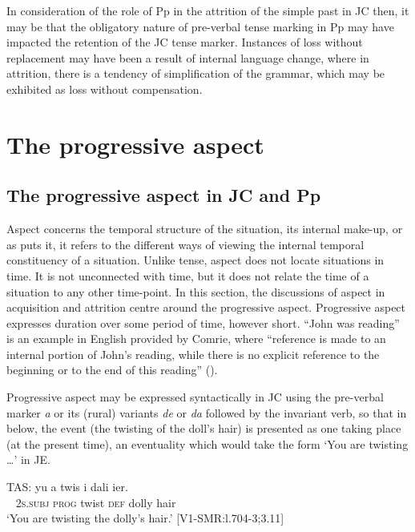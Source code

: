 \documentclass[output=paper,colorlinks,citecolor=brown]{langscibook}
\begin{document}
In consideration of the role of Pp in the attrition of the simple past in JC then, it may be that the obligatory nature of pre-verbal tense marking in Pp may have impacted the retention of the JC tense marker. Instances of loss without replacement may have been a result of internal language change, where in attrition, there is a tendency of simplification of the grammar, which may be exhibited as loss without compensation.

\section{The progressive aspect} \label{sec:messamk:5}
\subsection{The progressive aspect in JC and Pp } \label{sec:messamk:5.1}

 Aspect concerns the temporal structure of the situation, its internal make-up, or as \citet[3]{Comrie1976} puts it, it refers to the different ways of viewing the internal temporal constituency of a situation. Unlike tense, aspect does not locate situations in time. It is not unconnected with time, but it does not relate the time of a situation to any other time-point.  In this section, the discussions of aspect in acquisition and attrition centre around the progressive aspect. Progressive aspect expresses duration over some period of time, however short. “John was reading” is an example in English provided by Comrie, where “reference is made to an internal portion of John’s reading, while there is no explicit reference to the beginning or to the end of this reading” (\citeyear[4]{Comrie1976}).

Progressive aspect may be expressed syntactically in JC using the pre-verbal marker \textit{a} or its (rural) variants \textit{de} or \textit{da} followed by the invariant verb, so that in  below, the event (the twisting of the doll’s hair) is presented as one taking place (at the present time), an eventuality which would take the form ‘You are twisting …’ in JE.

\ea \label{bkm:messamK:21}
\gll   TAS:   yu     a       twis  i      dali   ier.\\
    ~ 2\textsc{s.subj} \textsc{prog} twist \textsc{def} dolly hair\\
\glt  \hphantom{TAS:} `You are twisting the dolly’s hair.’           [V1-SMR:l.704-3;3.11]
\z
\end{document}
